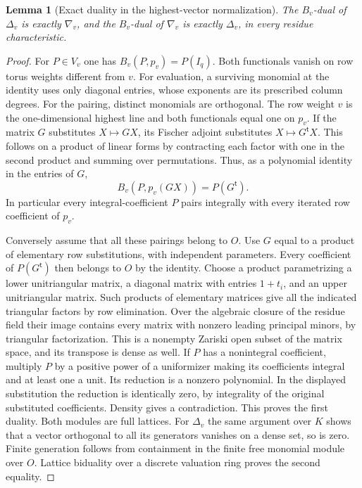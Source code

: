 \documentclass[a4paper,11pt]{article}
\newtheorem{lemma}[proposition]{Lemma}
\theoremstyle{definition}
\theoremstyle{remark}
\numberwithin{equation}{section}
\begin{document}
\begin{lemma}[Exact duality in the highest-vector normalization]\leavevmode
\label{lem:weyldual351}
The \(B_v\)-dual of \(\Delta_v\) is exactly \(\nabla_v\), and
the \(B_v\)-dual of \(\nabla_v\) is exactly \(\Delta_v\), in
every residue characteristic.
\end{lemma}
\begin{proof}
For \(P\in V_v\) one has \(B_v(P,p_v)=P(I_q)\).
Both functionals vanish on row torus weights different from \(v\).
For evaluation, a surviving monomial at the identity uses only
diagonal entries, whose exponents are its prescribed column
degrees. For the pairing, distinct monomials are orthogonal.
The row weight \(v\) is the one-dimensional highest line and
both functionals equal one on \(p_v\). If the matrix \(G\)
substitutes \(X\mapsto GX\), its Fischer adjoint substitutes
\(X\mapsto G^{\mathsf t}X\). This follows on a product of linear
forms by contracting each factor with one in the second product
and summing over permutations. Thus, as a polynomial identity in
the entries of \(G\),
\[
                    B_v(P,p_v(GX))=P(G^{\mathsf t}).
\]
In particular every integral-coefficient \(P\) pairs integrally
with every iterated row coefficient of \(p_v\).

Conversely assume that all these pairings belong to \(O\).
Use \(G\) equal to a product of elementary row substitutions,
with independent parameters. Every coefficient of
\(P(G^{\mathsf t})\) then belongs to \(O\) by the identity.
Choose a product parametrizing a lower unitriangular matrix,
a diagonal matrix with entries \(1+t_i\), and an upper
unitriangular matrix. Such products of elementary matrices
give all the indicated triangular factors by row elimination.
Over the algebraic closure of the residue field their image
contains every matrix with nonzero leading principal minors,
by triangular factorization. This is a nonempty Zariski open
subset of the matrix space, and its transpose is dense as well.
If \(P\) has a nonintegral coefficient, multiply \(P\) by a
positive power of a uniformizer making its coefficients integral
and at least one a unit. Its reduction is a nonzero polynomial.
In the displayed substitution the reduction is identically zero,
by integrality of the original substituted coefficients. Density
gives a contradiction. This proves the first duality. Both
modules are full lattices. For \(\Delta_v\) the same argument
over \(K\) shows that a vector orthogonal to all its generators
vanishes on a dense set, so is zero. Finite generation follows
from containment in the finite free monomial module over \(O\).
Lattice biduality over a discrete valuation ring proves the
second equality.
\end{proof}
\end{document}
